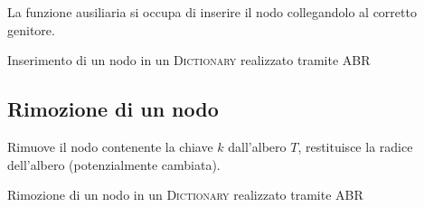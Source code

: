 La funzione ausiliaria \shortcut si occupa di inserire il nodo collegandolo al corretto genitore.

\begin{algorithm}[H]
	\caption{Inserimento di un nodo in un \textsc{Dictionary} realizzato tramite \textsc{ABR}}
	
	
	
\end{algorithm}

\clearpage
\subsection*{Rimozione di un nodo}

Rimuove il nodo contenente la chiave \(k\) dall'albero \(T\), restituisce la radice dell'albero (potenzialmente cambiata).

\begin{algorithm}[H]
	\caption{Rimozione di un nodo in un \textsc{Dictionary} realizzato tramite \textsc{ABR}}
	
	
\end{algorithm}

